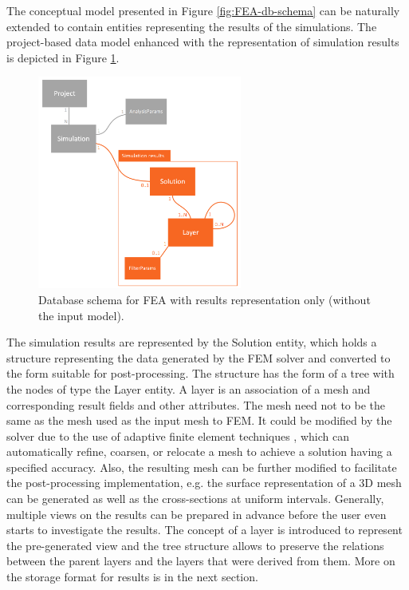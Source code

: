 
The conceptual model presented in Figure \ref{fig:FEA-db-schema} can be naturally extended to contain entities representing the results of the simulations. The project-based data model enhanced with the representation of simulation results is depicted in Figure \ref{fig:FEA-db-schema-results}.

\begin{figure}[H]
    \centering
    \includegraphics[width=0.6\textwidth]{figures/FEA-database-schema-only-results}
    \decoRule
    \caption{Database schema for FEA with results representation only (without the input model).}
    \label{fig:FEA-db-schema-results}
\end{figure}

The simulation results are represented by the Solution entity, which holds a structure representing the data generated by the FEM solver and converted to the form suitable for post-processing. The structure has the form of a tree with the nodes of type the Layer entity. A layer is an association of a mesh and corresponding result fields and other attributes. The mesh need not to be the same as the mesh used as the input mesh to FEM. It could be modified by the solver due to the use of adaptive finite element techniques \cite{XXX}, which can automatically refine, coarsen, or relocate a mesh to achieve a solution having a specified accuracy. Also, the resulting mesh can be further modified to facilitate the post-processing implementation, e.g. the surface representation of a 3D mesh can be generated as well as the cross-sections at uniform intervals. Generally, multiple views on the results can be prepared in advance before the user even starts to investigate the results. The concept of a layer is introduced to represent the pre-generated view and the tree structure allows to preserve the relations between the parent layers and the layers that were derived from them. More on the storage format for results is in the next section.


